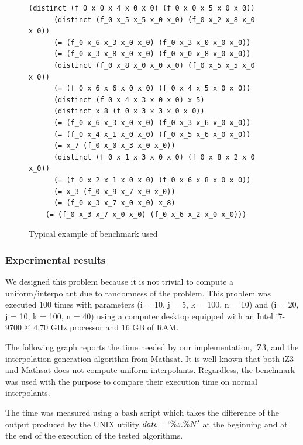 \begin{figure}[!ht]
\begin{BVerbatim}[fontsize=\tiny]
      (distinct (f_0 x_0 x_4 x_0 x_0) (f_0 x_0 x_5 x_0 x_0))
      (distinct (f_0 x_5 x_5 x_0 x_0) (f_0 x_2 x_8 x_0 x_0))
      (= (f_0 x_6 x_3 x_0 x_0) (f_0 x_3 x_0 x_0 x_0))
      (= (f_0 x_3 x_8 x_0 x_0) (f_0 x_0 x_8 x_0 x_0))
      (distinct (f_0 x_8 x_0 x_0 x_0) (f_0 x_5 x_5 x_0 x_0))
      (= (f_0 x_6 x_6 x_0 x_0) (f_0 x_4 x_5 x_0 x_0))
      (distinct (f_0 x_4 x_3 x_0 x_0) x_5)
      (distinct x_8 (f_0 x_3 x_3 x_0 x_0))
      (= (f_0 x_6 x_3 x_0 x_0) (f_0 x_3 x_6 x_0 x_0))
      (= (f_0 x_4 x_1 x_0 x_0) (f_0 x_5 x_6 x_0 x_0))
      (= x_7 (f_0 x_0 x_3 x_0 x_0))
      (distinct (f_0 x_1 x_3 x_0 x_0) (f_0 x_8 x_2 x_0 x_0))
      (= (f_0 x_2 x_1 x_0 x_0) (f_0 x_6 x_8 x_0 x_0))
      (= x_3 (f_0 x_9 x_7 x_0 x_0))
      (= (f_0 x_3 x_7 x_0 x_0) x_8)
    (= (f_0 x_3 x_7 x_0 x_0) (f_0 x_6 x_2 x_0 x_0)))
  \end{BVerbatim}
  \caption{Typical example of benchmark used}
\end{figure}

\subsubsection{Experimental results}

We designed this problem because it is not trivial to 
compute a  uniform/interpolant due to randomness of the
problem. This problem was executed $100$ times
with parameters (i = 10, j = 5, k = 100, n = 10) and 
(i = 20, j = 10, k = 100, n = 40)
using a computer desktop
equipped with an Intel i7-9700 @ 4.70 GHz processor 
and 16 GB of RAM. 

The following graph reports the time needed
by our implementation, iZ3, and the interpolation 
generation algorithm from Mathsat. 
It is well known that both iZ3 and Mathsat does not
compute uniform interpolants. Regardless, the benchmark
was used with the purpose to compare their execution time
on normal interpolants.

The time was
measured using a bash script which takes the difference
of the output produced by the UNIX utility $date +`\%s.\%N'$ 
at the beginning and at the end of the execution of the 
tested algorithms.

